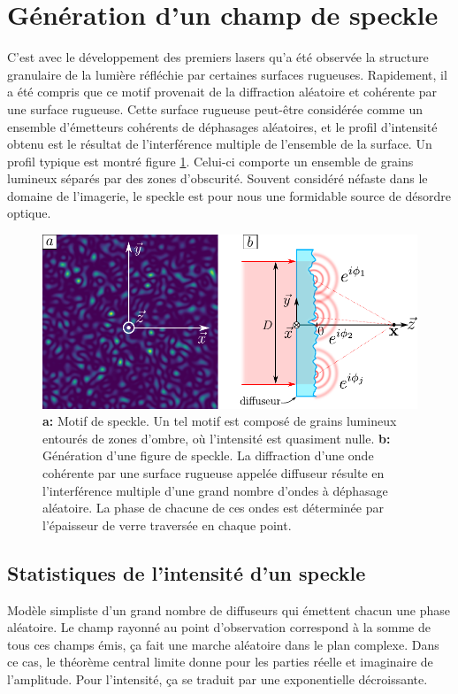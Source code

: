 \section{Génération d'un champ de speckle}
C'est avec le développement des premiers lasers qu'a été observée la structure granulaire de la lumière réfléchie par certaines surfaces rugueuses. Rapidement, il a été compris que ce motif provenait de la diffraction aléatoire et cohérente par une surface rugueuse. 
Cette surface rugueuse peut-être considérée comme un ensemble d'émetteurs cohérents de déphasages aléatoires, et le profil d'intensité obtenu est le résultat de l'interférence multiple de l'ensemble de la surface. Un profil typique est montré figure \ref{fig:speckle_pattern}. Celui-ci comporte un ensemble de grains lumineux séparés par des zones d'obscurité.
Souvent considéré néfaste dans le domaine de l'imagerie, le speckle est pour nous une formidable source de désordre optique. 

\begin{figure}
\centering
\includegraphics[scale=1]{Fig/Speckle/speckle_pattern.pdf}
\caption{\textbf{a:} Motif de speckle. Un tel motif est composé de grains lumineux entourés de zones d'ombre, où l'intensité est quasiment nulle. \textbf{b:} Génération d'une figure de speckle. La diffraction d'une onde cohérente par une surface rugueuse appelée diffuseur résulte en l'interférence multiple d'une grand nombre d'ondes à déphasage aléatoire. La phase de chacune de ces ondes est déterminée par l'épaisseur de verre traversée en chaque point.}
\label{fig:speckle_pattern}
\end{figure}



\subsection{Statistiques de l'intensité d'un speckle}
Modèle simpliste d'un grand nombre de diffuseurs qui émettent chacun une phase aléatoire. Le champ rayonné au point d'observation correspond à la somme de tous ces champs émis, ça fait une marche aléatoire dans le plan complexe. Dans ce cas, le théorème central limite donne pour les parties réelle et imaginaire de l'amplitude. Pour l'intensité, ça se traduit par une exponentielle décroissante.

